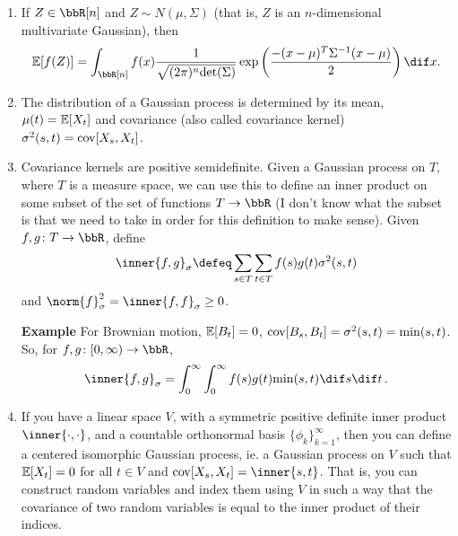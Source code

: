 \documentclass[../../../Master/AppliedStochastics.tex]{subfiles}
\begin{document}
\begin{enumerate}[(1)]
    \item
    If $Z \in \bbR[n]$ and $Z \sim N(\mu,\Sigma)$
        (that is, $Z$ is an $n$-dimensional multivariate Gaussian),
        then
    \begin{equation*}
        \E[f(Z)] = \int_{\bbR[n]}
            f(x) \dfrac{1}{\sqrt{(2\pi)^n \mathrm{det}(\Sigma)}}
            \exp\left(\dfrac{- (x - \mu)^T \Sigma^{-1} (x - \mu)}{2}\right)
                \dif x.
    \end{equation*}
    
    \item
    The distribution of a Gaussian process is determined by its mean, 
        $\mu(t)=\mathbb{E}[X_t]$ and covariance
            (also called covariance kernel) $\sigma^2(s, t) = \operatorname{cov}[X_s, X_t]$.
    
    \item
    Covariance kernels are positive semidefinite.
    Given a Gaussian process on $T$, where $T$ is a measure space,
        we can use this to define an inner product on some subset of
            the set of functions $T \to \bbR$
    (I don't know what the subset is that we need to take
        in order for this definition to make sense).
    Given $f, g \colon T \to \bbR$, define
    \begin{equation*}
        \inner{f, g}_{\sigma} \defeq \sum_{s \in T} \sum_{t \in T}
            f(s) g(t) \sigma^2(s, t)
    \end{equation*}
        and $\norm{f}_\sigma^2 = \inner{f, f}_\sigma \geq 0$.
    
    
    \textbf{Example}
    For Brownian motion,
        $\mathbb{E}[B_t]=0$, $\operatorname{cov}[B_s, B_t] = \sigma^2(s, t) = \mathrm{min}(s, t)$.
    So, for $f, g \colon [0, \infty) \to \bbR$,
    \begin{equation*}
        \inner{f, g}_\sigma = \int_0^\infty \int_0^\infty
            f(s) g(t) \mathrm{min}(s, t) \dif s \dif t\,.
    \end{equation*}


    \item
    If you have a linear space $V$,
        with a symmetric positive definite inner product $\inner{\cdot, \cdot}$,
        and a countable orthonormal basis $\{\phi_k\}_{k = 1}^{\infty}$,
            then you can define a centered isomorphic Gaussian process,
            ie. a Gaussian process on $V$ such that $\mathbb{E}[X_t] = 0$
                for all $t \in V$ and $\cov[X_s, X_t] = \inner{s, t}$.
    That is, you can construct random variables
        and index them using $V$ in such a way that
        the covariance of two random variables is equal to
        the inner product of their indices.



\end{enumerate}
\end{document}
